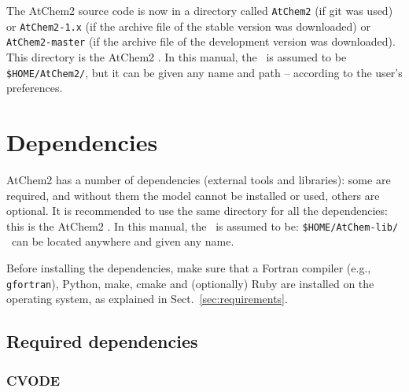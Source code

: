 The AtChem2 source code is now in a directory called \texttt{AtChem2}
(if git was used) or \texttt{AtChem2-1.x} (if the archive file of the
stable version was downloaded) or \texttt{AtChem2-master} (if the
archive file of the development version was downloaded). This
directory is the AtChem2 \maindir. In this manual, the \maindir\ is
assumed to be \texttt{\$HOME/AtChem2/}, but it can be given any name
and path -- according to the user's preferences.

\section{Dependencies} \label{sec:dependencies}

AtChem2 has a number of dependencies (external tools and libraries):
some are required, and without them the model cannot be installed or
used, others are optional. It is recommended to use the same directory
for all the dependencies: this is the AtChem2 \depdir. In this manual,
the \depdir\ is assumed to be: \texttt{\$HOME/AtChem-lib/} \ can be located
anywhere and given any name.

Before installing the dependencies, make sure that a Fortran compiler
(e.g., \texttt{gfortran}), Python, make, cmake and (optionally) Ruby
are installed on the operating system, as explained in
Sect.~\ref{sec:requirements}.

\subsection{Required dependencies} \label{subsec:required-dependencies}



\subsubsection{CVODE}

